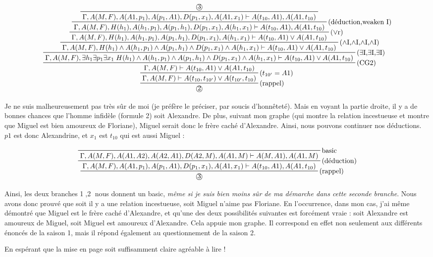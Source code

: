 \documentclass[10pt]{extarticle}
\begin{document}
\begin{landscape}
\begin{displaymath}
\prftree[r]{(rappel)}
{\prftree[r]{($t_{10'}=A1$)}
{\prftree[r]{(CG2)}
{\prftree[r]{($\exists$I,$\exists$I,$\exists$I)}
{\prftree[r]{($\land$I,$\land$I,$\land$I,$\land$I)}
{\prftree[r]{($\lor$r)}
{\prftree[r]{(déduction,weaken I)}
{\prftree[r]{}
{\text{\textcircled{3}}}
{\Gamma , A(M,F) , A(A1,p_1) , A(p_1,A1) , D(p_1,x_1) , A(A1,x_1) \vdash A(t_{10},A1) , A(A1,t_{10})}}
{\Gamma , A(M,F) , H(h_1) , A(h_1,p_1) , A(p_1,h_1) , D(p_1,x_1) , A(h_1,x_1) \vdash A(t_{10},A1) , A(A1,t_{10})}}
{\Gamma , A(M,F) , H(h_1) , A(h_1,p_1) , A(p_1,h_1) , D(p_1,x_1) , A(h_1,x_1) \vdash A(t_{10},A1) \lor A(A1,t_{10})}}
{\Gamma , A(M,F) , H(h_1) \land A(h_1,p_1) \land A(p_1,h_1) \land D(p_1,x_1) \land A(h_1,x_1) \vdash A(t_{10},A1) \lor A(A1,t_{10})}}
{\Gamma , A(M,F) , \exists h_1 \exists p_1 \exists x_1 \; H(h_1) \land A(h_1,p_1) \land A(p_1,h_1) \land D(p_1,x_1) \land A(h_1,x_1) \vdash A(t_{10},A1) \lor A(A1,t_{10})}}
{\Gamma , A(M,F) \vdash A(t_{10},A1) \lor A(A1,t_{10})}}
{\Gamma , A(M,F) \vdash A(t_{10},t_{10'}) \lor A(t_{10'},t_{10})}}
{\text{\textcircled{2}}}
\end{displaymath}

Je ne suis malheureusement pas très sûr de moi (je préfère le préciser, par soucis d’honnêteté). Mais en voyant la partie droite, il y a de bonnes chances que l'homme infidèle (formule 2) soit Alexandre. De plus, suivant mon graphe (qui montre la relation incestueuse et montre que Miguel est bien amoureux de Floriane), Miguel serait donc le frère caché d'Alexandre. Ainsi, nous pouvons continuer nos déductions. $p1$ est donc Alexandrine, et $x_1$ est $t_{10}$ qui est aussi Miguel :

\begin{displaymath}
\prftree[r]{(rappel)}
{\prftree[r]{(déduction)}
{\prftree[r]{basic}
{}
{\Gamma , A(M,F) , A(A1,A2) , A(A2,A1) , D(A2,M) , A(A1,M) \vdash A(M,A1) , A(A1,M)}}
{\Gamma , A(M,F) , A(A1,p_1) , A(p_1,A1) , D(p_1,x_1) , A(A1,x_1) \vdash A(t_{10},A1) , A(A1,t_{10})}}
{\text{\textcircled{3}}}
\end{displaymath}
\end{landscape}
\newpage

Ainsi, les deux branches \textcircled{1},\textcircled{2} nous donnent un basic, \emph{même si je suis bien moins sûr de ma démarche dans cette seconde branche}. Nous avons donc prouvé que soit il y a une relation incestueuse, soit Miguel n'aime pas Floriane. En l'occurrence, dans mon cas, j'ai même démontré que Miguel est le frère caché d'Alexandre, et qu'une des deux possibilités suivantes est forcément vraie : soit Alexandre est amoureux de Miguel, soit Miguel est amoureux d'Alexandre. Cela appuie mon graphe. Il correspond en effet non seulement aux différents énoncés de la saison 1, mais il répond également au questionnement de la saison 2.
\vspace{0.6cm}

En espérant que la mise en page soit suffisamment claire agréable à lire !


\end{document}
